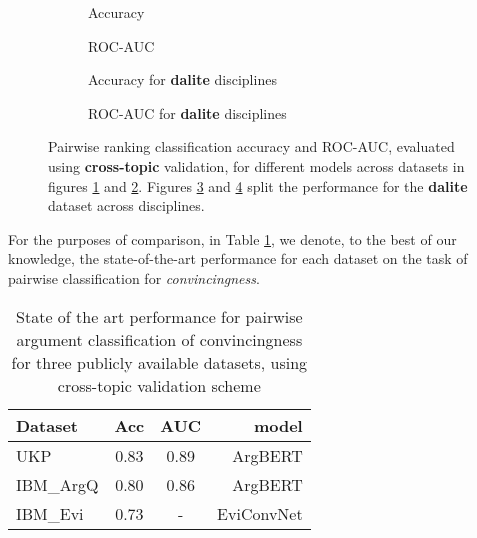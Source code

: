 \documentclass[runningheads]{llncs}
\begin{document}
\begin{figure}
	\begin{subfigure}[t]{0.5\linewidth}
		\centering
		\scalebox{0.4}{}
		\caption{Accuracy}
		\label{fig:acc_cross_topic}
	\end{subfigure}%
	\qquad
	\begin{subfigure}[t]{0.5\linewidth}
		\centering
		\scalebox{0.4}{}
		\caption{ROC-AUC}
		\label{fig:AUC_cross_topic}
	\end{subfigure}
	\begin{subfigure}[t]{0.5\linewidth}
		\centering
		\scalebox{0.4}{}
		\caption{Accuracy for \textbf{dalite} disciplines}
		\label{fig:acc_dalite_cross_topic}
	\end{subfigure}%
	\qquad
	\begin{subfigure}[t]{0.5\linewidth}
		\centering
		\scalebox{0.4}{}
		\caption{ROC-AUC for \textbf{dalite} disciplines}
		\label{fig:AUC_dalite_cross_topic}
	\end{subfigure}
	\caption{Pairwise ranking classification accuracy and ROC-AUC, evaluated 
		using \textbf{cross-topic} validation, for 
		different models across datasets in figures 
		\ref{fig:acc_cross_topic} 
		and \ref{fig:AUC_cross_topic}. Figures \ref{fig:acc_dalite_cross_topic} 
		and 
		\ref{fig:AUC_dalite_cross_topic} split the performance for the 
		\textbf{dalite} dataset across disciplines.}
	\label{fig:performance_cross_topic}
	
\end{figure}


For the purposes of comparison, in Table \ref{tab:sota}, we denote, to the best 
of our knowledge, the state-of-the-art performance for each dataset on the task 
of pairwise  classification for \textit{convincingness}. 

\begin{table} 
	\caption{State of the art performance for pairwise argument classification 
	of 
	convincingness for three publicly available datasets, using cross-topic 
	validation scheme}
\label{tab:sota}
	\centering\begin{tabular}{l|*{2}{c}r}
		Dataset     & Acc & AUC & model  	   \\
		\hline
		UKP 		& 0.83 & 0.89 & ArgBERT\cite{toledo_automatic_2019}    \\
		IBM\_ArgQ   & 0.80 & 0.86 & ArgBERT\cite{toledo_automatic_2019}    \\
		IBM\_Evi    & 0.73 & - 	  & EviConvNet\cite{gleize_are_2019} \\
	\end{tabular}
\end{table}
\end{document}
